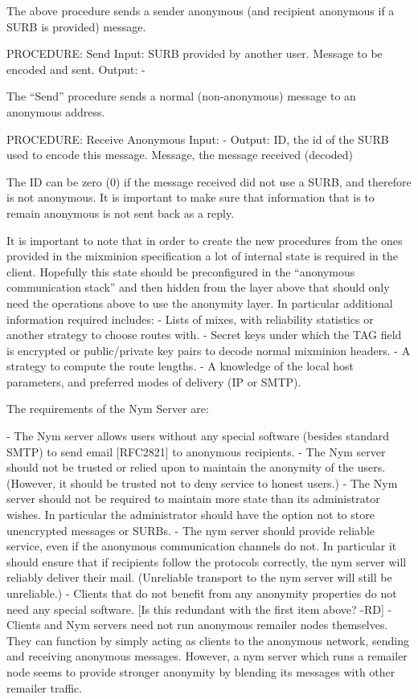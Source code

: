 The above procedure sends a sender anonymous (and recipient anonymous
if a SURB is provided) message.

PROCEDURE: Send
Input: SURB provided by another user.
       Message to be encoded and sent.
Output: -

The ``Send'' procedure sends a normal (non-anonymous) message to an
anonymous address.

PROCEDURE: Receive Anonymous 
Input: -
Output: ID, the id of the SURB used to encode this message.
	Message, the message received (decoded)

The ID can be zero (0) if the message received did not use a SURB, and
therefore is not anonymous. It is important to make sure that
information that is to remain anonymous is not sent back as a reply.

It is important to note that in order to create the new procedures
from the ones provided in the mixminion specification a lot of
internal state is required in the client. Hopefully this state should
be preconfigured in the ``anonymous communication stack'' and then
hidden from the layer above that should only need the operations above
to use the anonymity layer. In particular additional information
required includes:
- Lists of mixes, with reliability statistics or another strategy to
choose routes with.
- Secret keys under which the TAG field is encrypted or public/private
key pairs to decode normal mixminion headers.
- A strategy to compute the route lengths.
- A knowledge of the local host parameters, and preferred modes of
delivery (IP or SMTP).


The requirements of the Nym Server are:

- The Nym server allows users without any special software (besides
  standard SMTP) to send email [RFC2821] to anonymous recipients.
- The Nym server should not be trusted or relied upon to maintain the
  anonymity of the users. (However, it should be trusted not to deny
  service to honest users.)
- The Nym server should not be required to maintain more state than
  its administrator wishes. In particular the administrator should
  have the option not to store unencrypted messages or SURBs.
- The nym server should provide reliable service, even if the
  anonymous communication channels do not. In particular it should
  ensure that if recipients follow the protocols correctly, the nym
  server will reliably deliver their mail. (Unreliable transport to
  the nym server will still be unreliable.)
- Clients that do not benefit from any anonymity properties do not
  need any special software.
[Is this redundant with the first item above? -RD]
- Clients and Nym servers need not run anonymous remailer nodes
  themselves. They can function by simply acting as clients to the
  anonymous network, sending and receiving anonymous messages. However,
  a nym server which runs a remailer node seems to provide stronger
  anonymity by blending its messages with other remailer traffic.


